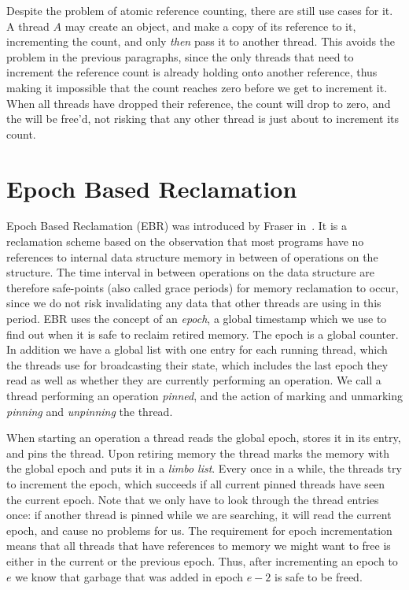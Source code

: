\documentclass[b5paper]{report}
\begin{document}
Despite the problem of atomic reference counting, there are still use cases for
it. A thread $A$ may create an  object, and make a copy of its
reference to it, incrementing the count, and only \emph{then} pass it to another
thread. This avoids the problem in the previous paragraphs, since the only
threads that need to increment the reference count is already holding onto
another reference, thus making it impossible that the count reaches zero before
we get to increment it. When all threads have dropped their reference, the
count will drop to zero, and the  will be free'd, not risking that any
other thread is just about to increment its count.
\clearpage
\section{Epoch Based Reclamation\label{sec:ebr}}

Epoch Based Reclamation (EBR) was introduced by Fraser
in~\cite{fraser2004practical}. It is a reclamation scheme based on the
observation that most programs have no references to internal data structure
memory in between of operations on the structure. The time interval in between
operations on the data structure are therefore safe-points (also called grace
periods) for memory reclamation to occur, since we do not risk invalidating any
data that other threads are using in this period. EBR uses the concept of an
\emph{epoch}, a global timestamp which we use to find out when it is safe to
reclaim retired memory. The epoch is a global counter. In addition we have a
global list with one entry for each running thread, which the threads use for
broadcasting their state, which includes the last epoch they read as well as
whether they are currently performing an operation. We call a thread performing
an operation \emph{pinned}, and the action of marking and unmarking
\emph{pinning} and \emph{unpinning} the thread.

When starting an operation a thread reads the global epoch, stores it in its
entry, and pins the thread. Upon retiring memory the thread marks the memory
with the global epoch and puts it in a \emph{limbo list}. Every once in a while,
the threads try to increment the epoch, which succeeds if all current pinned
threads have seen the current epoch. Note that we only have to look through the
thread entries once: if another thread is pinned while we are searching, it will
read the current epoch, and cause no problems for us. The requirement for epoch
incrementation means that all threads that have references to memory we might
want to free is either in the current or the previous epoch. Thus, after
incrementing an epoch to $e$ we know that garbage that was added in epoch $e-2$
is safe to be freed.
\end{document}
